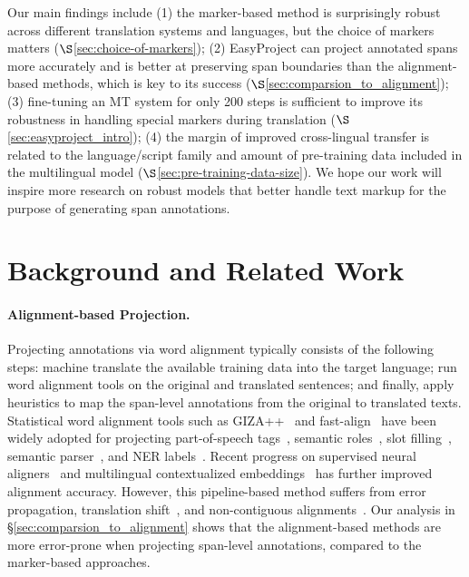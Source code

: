 \documentclass[11pt,dvipsnames]{article}
\begin{document}
Our main findings include (1) the marker-based method is surprisingly robust across different translation systems and languages, but the choice of markers matters ($\S$\ref{sec:choice-of-markers}); (2) EasyProject can project annotated spans more accurately and is better at preserving span boundaries than the  alignment-based methods, which is key to its success ($\S$\ref{sec:comparsion_to_alignment}); (3)  fine-tuning an MT system for only 200 steps is sufficient  to improve its robustness in handling special markers during translation ($\S$\ref{sec:easyproject_intro}); (4) the margin of improved cross-lingual transfer is related to the language/script family and amount of pre-training data included in the multilingual model ($\S$\ref{sec:pre-training-data-size}). 
We hope our work will inspire more research on robust models that better handle text markup for the purpose of generating span annotations.










\section{Background and Related Work}

\paragraph{Alignment-based Projection.}  Projecting annotations via word alignment typically consists of the following steps: machine translate the available training data into the target language; run word alignment tools on the original and translated sentences; and finally, apply heuristics to map the span-level annotations from the original to translated texts. 
Statistical word alignment tools such as  GIZA++~\citep{giza} and fast-align~\citep{dyer2013fast}  have been widely adopted for projecting part-of-speech tags~\citep{yarowsky-etal-2001-inducing,eskander2020unsupervised}, semantic roles~\citep{akbik-etal-2015-srl,aminian-etal-2017-transferring,daza2020xsrl,fei2020srl}, slot filling~\citep{xu2020end}, semantic parser~\citep{moradshahi-etal-2020-localizing,nicosia-etal-2021-translate-fill}, and NER labels~\citep{ni-etal-2017-weakly,stengel-eskin-etal-2019-discriminative}.
Recent progress on supervised neural aligners~\citep{jalili-sabet-etal-2020-simalign,nagata2020supervised,dou2021awesome,lan2021crfalign} and multilingual contextualized embeddings~\citep{devlin2019mbert,conneau2019xlmr} has further improved alignment accuracy.
However, this pipeline-based method suffers from error propagation, translation shift~\citep{akbik-etal-2015-srl}, and    non-contiguous alignments~\citep{zenkel-etal-2020-end}.
Our analysis in \S \ref{sec:comparsion_to_alignment} shows that the  alignment-based methods are  more error-prone when projecting span-level annotations, compared to the marker-based approaches.
\end{document}
